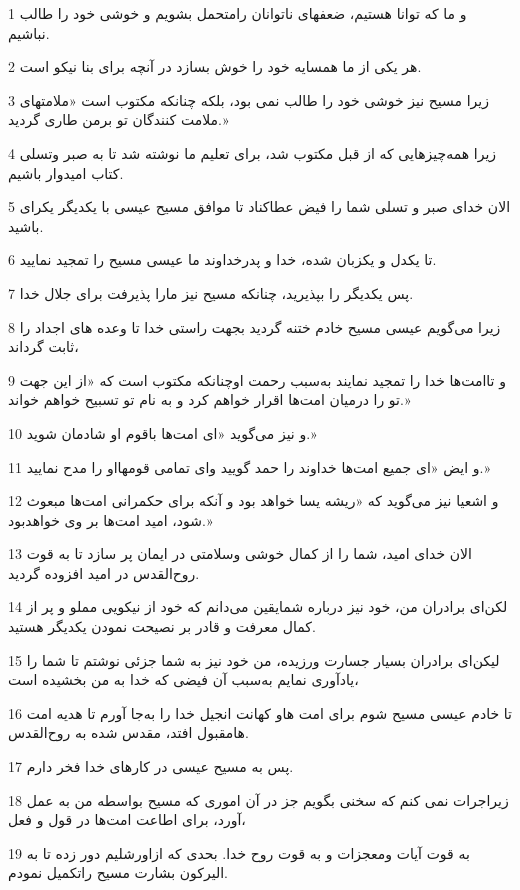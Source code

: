 \par 1 و ما که توانا هستیم، ضعفهای ناتوانان رامتحمل بشویم و خوشی خود را طالب نباشیم.
\par 2 هر یکی از ما همسایه خود را خوش بسازد در آنچه برای بنا نیکو است.
\par 3 زیرا مسیح نیز خوشی خود را طالب نمی بود، بلکه چنانکه مکتوب است «ملامتهای ملامت کنندگان تو برمن طاری گردید.»
\par 4 زیرا همه‌چیزهایی که از قبل مکتوب شد، برای تعلیم ما نوشته شد تا به صبر وتسلی کتاب امیدوار باشیم.
\par 5 الان خدای صبر و تسلی شما را فیض عطاکناد تا موافق مسیح عیسی با یکدیگر یکرای باشید.
\par 6 تا یکدل و یکزبان شده، خدا و پدرخداوند ما عیسی مسیح را تمجید نمایید.
\par 7 پس یکدیگر را بپذیرید، چنانکه مسیح نیز مارا پذیرفت برای جلال خدا.
\par 8 زیرا می‌گویم عیسی مسیح خادم ختنه گردید بجهت راستی خدا تا وعده های اجداد را ثابت گرداند،
\par 9 و تاامت‌ها خدا را تمجید نمایند به‌سبب رحمت اوچنانکه مکتوب است که «از این جهت تو را درمیان امت‌ها اقرار خواهم کرد و به نام تو تسبیح خواهم خواند.»
\par 10 و نیز می‌گوید «ای امت‌ها باقوم او شادمان شوید.»
\par 11 و ایض «ای جمیع امت‌ها خداوند را حمد گویید و‌ای تمامی قومهااو را مدح نمایید.»
\par 12 و اشعیا نیز می‌گوید که «ریشه یسا خواهد بود و آنکه برای حکمرانی امت‌ها مبعوث شود، امید امت‌ها بر وی خواهدبود.»
\par 13 الان خدای امید، شما را از کمال خوشی وسلامتی در ایمان پر سازد تا به قوت روح‌القدس در امید افزوده گردید.
\par 14 لکن‌ای برادران من، خود نیز درباره شمایقین می‌دانم که خود از نیکویی مملو و پر از کمال معرفت و قادر بر نصیحت نمودن یکدیگر هستید.
\par 15 لیکن‌ای برادران بسیار جسارت ورزیده، من خود نیز به شما جزئی نوشتم تا شما را یادآوری نمایم به‌سبب آن فیضی که خدا به من بخشیده است،
\par 16 تا خادم عیسی مسیح شوم برای امت هاو کهانت انجیل خدا را به‌جا آورم تا هدیه امت هامقبول افتد، مقدس شده به روح‌القدس.
\par 17 پس به مسیح عیسی در کارهای خدا فخر دارم.
\par 18 زیراجرات نمی کنم که سخنی بگویم جز در آن اموری که مسیح بواسطه من به عمل آورد، برای اطاعت امت‌ها در قول و فعل،
\par 19 به قوت آیات ومعجزات و به قوت روح خدا. بحدی که ازاورشلیم دور زده تا به الیرکون بشارت مسیح راتکمیل نمودم.

